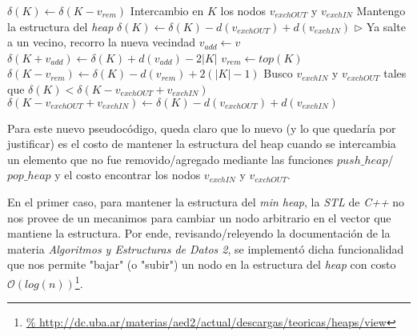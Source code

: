 \begin{pseudocodigo}
                \State $\delta(K) \gets \delta(K-v_{rem})$ 
                \Statex
            \Else
                \State Intercambio en $K$ los nodos $v_{exchOUT}$ y $v_{exchIN}$ 
                \State Mantengo la estructura del \emph{heap} 
                \State $\delta(K) \gets \delta(K) - d(v_{exchOUT}) + d(v_{exchIN})$ 
            \EndIf {}
            \Statex
            \Statex $\triangleright$ Ya salte a un vecino, recorro la nueva vecindad
             
                \State $v_{add} \gets v$ 
                \State $\delta(K+v_{add}) \gets \delta(K) + d(v_{add}) - 2|K|$ 
            \EndIf {}
            \Statex
            \State $v_{rem} \gets top(K)$ 
            \State $\delta(K-v_{rem}) \gets \delta(K)-d(v_{rem})+2(|K|-1)$ 
            \Statex
            \State Busco $v_{exchIN}$ y $v_{exchOUT}$ tales que $\delta(K) < \delta(K-v_{exchOUT}+v_{exchIN})$ 
            \State $\delta(K-v_{exchOUT}+v_{exchIN}) \gets \delta(K) - d(v_{exchOUT}) + d(v_{exchIN})$ 
            \Statex
        \EndWhile {}
    \EndIf {}
    \State {} 
    \Statex
    \Statex {}
\end{pseudocodigo}

\bigskip

\par Para este nuevo pseudoc\'odigo, queda claro que lo nuevo (y lo que quedar\'ia por
    justificar) es el costo de mantener la estructura del heap cuando se intercambia
    un elemento que no fue removido/agregado mediante las funciones $push\_heap$/%
    $pop\_heap$ y el costo encontrar los nodos $v_{exchIN}$ y $v_{exchOUT}$.

\par En el primer caso, para mantener la estructura del \emph{min heap}, la \emph{STL}
    de \emph{C++} no nos provee de un mecanimos para cambiar un nodo arbitrario en
    el vector que mantiene la estructura. Por ende, revisando/releyendo la documentaci\'on
    de la materia \emph{Algoritmos y Estructuras de Datos 2}, se implement\'o
    dicha funcionalidad que nos permite "bajar" (o "subir") un nodo en la estructura
    del \emph{heap} con costo $\mathcal O(log(n))$\footnote{\url{%
    http://dc.uba.ar/materias/aed2/actual/descargas/teoricas/heaps/view}}.

